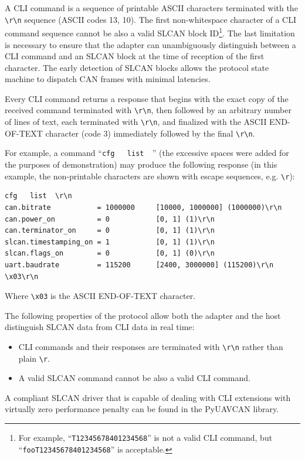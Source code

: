 \documentclass{zubaxdoc}
\begin{document}
A CLI command is a sequence of printable ASCII characters terminated with the
\verb|\r\n| sequence (ASCII codes 13, 10).
The first non-whitespace character of a CLI command sequence cannot be also a valid
SLCAN block ID\footnote{For example, ``\texttt{T12345678401234568}'' is not a valid CLI command,
but ``\texttt{fooT12345678401234568}'' is acceptable.}.
The last limitation is necessary to ensure that the adapter can unambiguously distinguish between
a CLI command and an SLCAN block at the time of reception of the first character.
The early detection of SLCAN blocks allows the protocol state machine to dispatch CAN frames with
minimal latencies.

Every CLI command returns a response that begins with the exact copy of the received command terminated with
\verb|\r\n|,
then followed by an arbitrary number of lines of text,
each terminated with \verb|\r\n|,
and finalized with the ASCII END-OF-TEXT character (code 3) immediately followed by the final
\verb|\r\n|.

For example, a command ``\verb|cfg   list  |'' (the excessive spaces were added for the purposes of demonstration)
may produce the following response (in this example, the non-printable characters are shown with escape sequences,
e.g. \verb|\r|):

\begin{verbatim}
cfg   list  \r\n
can.bitrate           = 1000000     [10000, 1000000] (1000000)\r\n
can.power_on          = 0           [0, 1] (1)\r\n
can.terminator_on     = 0           [0, 1] (1)\r\n
slcan.timestamping_on = 1           [0, 1] (1)\r\n
slcan.flags_on        = 0           [0, 1] (0)\r\n
uart.baudrate         = 115200      [2400, 3000000] (115200)\r\n
\x03\r\n
\end{verbatim}

Where \verb|\x03| is the ASCII END-OF-TEXT character.

The following properties of the protocol allow both the adapter and the host
distinguish SLCAN data from CLI data in real time:
\begin{itemize}
    \item CLI commands and their responses are terminated with \verb|\r\n| rather than plain \verb|\r|.
    \item A valid SLCAN command cannot be also a valid CLI command.
\end{itemize} 
A compliant SLCAN driver that is capable of dealing with CLI extensions with virtually zero performance penalty
can be found in the PyUAVCAN library.
\end{document}
